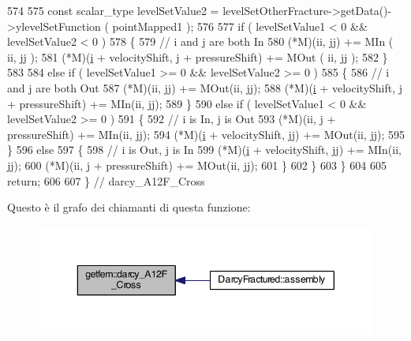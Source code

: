 \begin{DoxyCode}
574            
575             \textcolor{keyword}{const} scalar\_type levelSetValue2 = levelSetOtherFracture->getData()->ylevelSetFunction ( 
      pointMapped1 );
576 
577             \textcolor{keywordflow}{if} ( levelSetValue1 < 0 && levelSetValue2 < 0 )
578             \{
579                 \textcolor{comment}{// i and j are both In}
580                 (*M)(ii, jj) += MIn ( ii, jj );
581                 (*M)(\hyperlink{matrici_8m_a6f6ccfcf58b31cb6412107d9d5281426}{i} + velocityShift, j + pressureShift) += MOut ( ii, jj );
582             \}
583 
584             \textcolor{keywordflow}{else} \textcolor{keywordflow}{if} ( levelSetValue1 >= 0 && levelSetValue2 >= 0 )
585             \{
586                 \textcolor{comment}{// i and j are both Out}
587                 (*M)(ii, jj) += MOut(ii, jj);
588                 (*M)(\hyperlink{matrici_8m_a6f6ccfcf58b31cb6412107d9d5281426}{i} + velocityShift, j + pressureShift) += MIn(ii, jj);
589             \}
590             \textcolor{keywordflow}{else} \textcolor{keywordflow}{if} ( levelSetValue1 < 0 && levelSetValue2 >= 0 )
591             \{
592                 \textcolor{comment}{// i is In, j is Out}
593                 (*M)(ii, j + pressureShift) += MIn(ii, jj);
594                 (*M)(\hyperlink{matrici_8m_a6f6ccfcf58b31cb6412107d9d5281426}{i} + velocityShift, jj) += MOut(ii, jj);
595             \}
596             \textcolor{keywordflow}{else}
597             \{
598                 \textcolor{comment}{// i is Out, j is In}
599                 (*M)(\hyperlink{matrici_8m_a6f6ccfcf58b31cb6412107d9d5281426}{i} + velocityShift, jj) += MIn(ii, jj);
600                 (*M)(ii, j + pressureShift) += MOut(ii, jj);
601             \}
602         \}
603     \}
604 
605     \textcolor{keywordflow}{return};
606     
607 \} \textcolor{comment}{// darcy\_A12F\_Cross}
\end{DoxyCode}


Questo è il grafo dei chiamanti di questa funzione\-:\nopagebreak
\begin{figure}[H]
\begin{center}
\leavevmode
\includegraphics[width=343pt]{namespacegetfem_a88df6c0cb0765d5ab0fae27679cd30f4_icgraph}
\end{center}
\end{figure}


